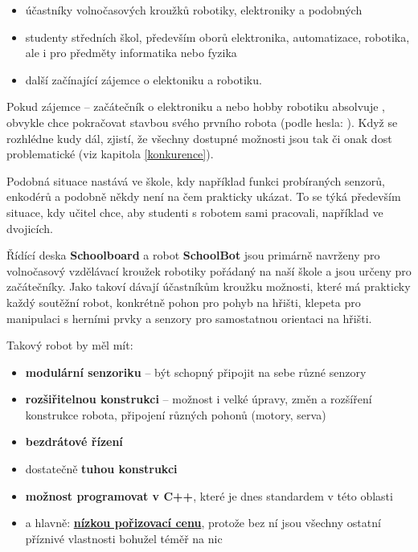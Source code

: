 \documentclass{template/socthesis}
\begin{document}
\begin{itemize}
	\item účastníky volnočasových kroužků robotiky, elektroniky a podobných
	\item studenty středních škol, především oborů elektronika, automatizace, robotika, ale i pro předměty informatika nebo fyzika
	\item další začínající zájemce o elektoniku a robotiku. 
\end{itemize}


 Pokud zájemce -- začátečník  o elektroniku a nebo hobby robotiku absolvuje , obvykle chce pokračovat stavbou svého prvního robota (podle hesla: ). Když se 
 rozhlédne kudy dál, zjistí, že všechny dostupné možnosti jsou tak či onak dost problematické (viz kapitola \ref{konkurence}). 
 
 Podobná situace nastává ve škole, kdy například funkci probíraných senzorů, enkodérů a podobně někdy není na čem prakticky ukázat. To se týká především situace, kdy učitel chce, aby studenti s robotem sami pracovali, například ve dvojicích.   

Řídící deska \textbf{Schoolboard} a robot \textbf{SchoolBot} jsou primárně navrženy pro volnočasový vzdělávací kroužek robotiky pořádaný na naší škole a jsou určeny pro začátečníky. Jako takoví dávají účastníkům kroužku možnosti, které má prakticky každý soutěžní robot, konkrétně pohon pro pohyb na hřišti, klepeta pro manipulaci s herními prvky a senzory pro samostatnou orientaci na hřišti. 
\newpage

 Takový robot by měl mít: 

\begin{itemize}
	\item \textbf{modulární senzoriku} -- být schopný připojit na sebe různé senzory 
	
	\item \textbf{rozšiřitelnou konstrukci} -- možnost i velké úpravy, změn a rozšíření konstrukce robota, připojení různých pohonů (motory, serva)
	
	\item \textbf{bezdrátové řízení}
	
	\item dostatečně \textbf{tuhou konstrukci}
	
	\item  \textbf{možnost programovat v C++}, které je dnes standardem v této oblasti
	
	\item a hlavně: \underline{\textbf{nízkou pořizovací cenu}}, protože bez ní jsou všechny ostatní příznivé vlastnosti bohužel téměř na nic 
	
\end{itemize}
\end{document}
